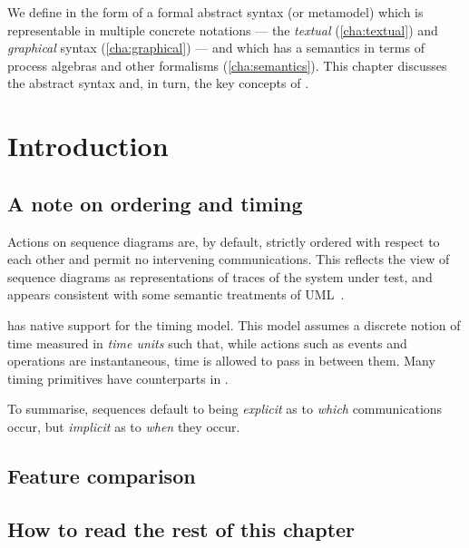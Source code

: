

We define \langname{} in the form of a formal abstract syntax (or
metamodel) which is representable in multiple concrete notations ---
the \emph{textual} (\cref{cha:textual}) and \emph{graphical}
syntax (\cref{cha:graphical}) --- and which has a semantics in terms
of process algebras and other formalisms (\cref{cha:semantics}).  This
chapter discusses the abstract syntax and, in turn, the key concepts
of \langname.

\section{Introduction}\label{sec:metamodel-intro}

\subsection{A note on ordering and timing}\label{sec:metamodel-intro-ordering}

Actions on \langname{} sequence diagrams are, by default, strictly
ordered with respect to each other and permit no intervening
communications.  This reflects the view of sequence diagrams as
representations of traces of the system under test, and appears
consistent with some semantic treatments of UML~\cite{lima-semantics}.

\langname{} has native support for the \robochart{} timing model.
This model assumes a discrete notion of time measured in \emph{time
  units} such that, while actions such as events and operations are
instantaneous, time is allowed to pass in between them.  Many
\robochart{} timing primitives have counterparts in \langname.

To summarise, \langname{} sequences default to being \emph{explicit}
as to \emph{which} communications occur, but \emph{implicit} as to
\emph{when} they occur.

\subsection{Feature comparison}\label{ssec:metamodel-intro-features}


\subsection{How to read the rest of this chapter}\label{ssec:metamodel-intro-readme}

